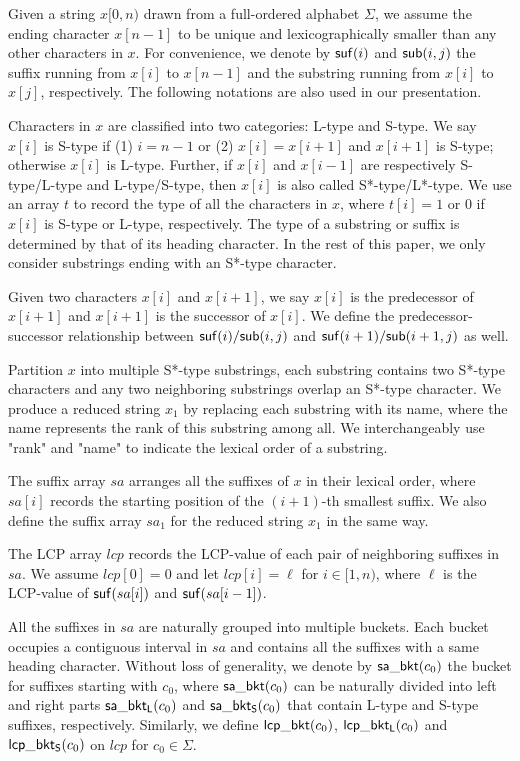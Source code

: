\documentclass[10pt,journal,compsoc]{IEEEtran}
\begin{document}
Given a string $x[0,n)$ drawn from a full-ordered alphabet $\Sigma$, we assume the ending character $x[n - 1]$ to be unique and lexicographically smaller than any other characters in $x$. For convenience, we denote by ${\sf suf}(i)$ and ${\sf sub}(i, j)$ the suffix running from $x[i]$ to $x[n-  1]$ and the substring running from $x[i]$ to $x[j]$, respectively. The following notations are also used in our presentation.

Characters in $x$ are classified into two categories: L-type and S-type. We say $x[i]$ is S-type if (1) $i = n - 1$ or (2) $x[i] = x[i + 1]$ and $x[i + 1]$ is S-type; otherwise $x[i]$ is L-type. Further, if $x[i]$ and $x[i - 1]$ are respectively S-type/L-type and L-type/S-type, then $x[i]$ is also called S*-type/L*-type. We use an array $t$ to record the type of all the characters in $x$, where $t[i] = 1$ or $0$ if $x[i]$ is S-type or L-type, respectively. The type of a substring or suffix is determined by that of its heading character. In the rest of this paper, we only consider substrings ending with an S*-type character.

Given two characters $x[i]$ and $x[i + 1]$, we say $x[i]$ is the predecessor of $x[i + 1]$ and $x[i + 1]$ is the successor of $x[i]$. We define the predecessor-successor relationship between ${\sf suf}(i)/{\sf sub}(i, j)$ and ${\sf suf}(i + 1)/{\sf sub}(i + 1, j)$ as well.

Partition $x$ into multiple S*-type substrings, each substring contains two S*-type characters and any two neighboring substrings overlap an S*-type character. We produce a reduced string $x_1$ by replacing each substring with its name, where the name represents the rank of this	 substring among all. We interchangeably use "rank" and "name"  to indicate the lexical order of a substring.

The suffix array $sa$ arranges all the suffixes of $x$ in their lexical order, where $sa[i]$ records the starting position of the $(i + 1)$-th smallest suffix. We also define the suffix array $sa_1$ for the reduced string $x_1$ in the same way.

The LCP array $lcp$ records the LCP-value of each pair of neighboring suffixes in $sa$. We assume $lcp[0] = 0$ and let $lcp[i] = \ell$ for $i \in [1, n)$, where $\ell$ is the LCP-value of ${\sf suf}(sa[i])$ and ${\sf suf}(sa[i - 1])$.

All the suffixes in $sa$ are naturally grouped into multiple buckets. Each bucket occupies a contiguous interval in $sa$ and contains all the suffixes with a same heading character. Without loss of generality, we denote by ${\sf sa\_bkt}(c_0)$ the bucket for suffixes starting with $c_0$, where ${\sf sa\_bkt}(c_0)$ can be naturally divided into left and right parts ${\sf sa\_bkt_L}(c_0)$ and ${\sf sa\_bkt_S}(c_0)$ that contain L-type and S-type suffixes, respectively. Similarly, we define ${\sf lcp\_bkt}(c_0)$, ${\sf lcp\_bkt_L}(c_0)$ and ${\sf lcp\_bkt_S}(c_0)$ on $lcp$ for $c_0 \in \Sigma$.
\end{document}
